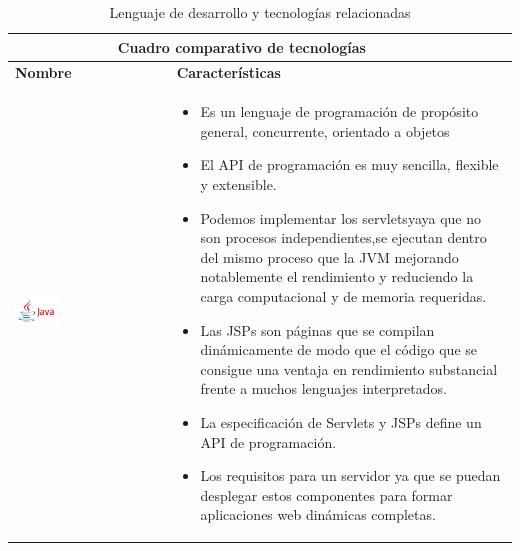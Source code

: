 \newpage
\begin{table}[b!]
	\centering
	\vspace{-30mm}
	\begin{tabular}{|p{2cm}|ll}
		\hline
		\multicolumn{2}{|c|}{{\bf Cuadro comparativo de tecnologías}} \\ 
		\hline
		\multicolumn{1}{|p{4cm}|}{{\bf Nombre}}                                       &   
		\multicolumn{1}{p{10cm}|}{{\bf Características}}\\
		\hline
		\multicolumn{1}{|p{5cm}|}{\includegraphics[width=0.3\textwidth]{images/java}} &   
		\multicolumn{2}{p{10cm}|}{\begin{itemize}
		\vspace{-25mm}
		\item Es un lenguaje de programación de propósito general, concurrente, orientado a objetos 
		\item El API de programación es muy sencilla, flexible y extensible.
		\item Podemos implementar los servletsyaya que no son procesos independientes,se ejecutan dentro del mismo proceso que la JVM mejorando notablemente el rendimiento y reduciendo la carga computacional y de memoria requeridas.
		\item Las JSPs son páginas que se compilan dinámicamente de modo que el código que se consigue una ventaja en rendimiento substancial frente a muchos lenguajes interpretados.
		\item La especificación de Servlets y JSPs define un API de programación.
		\item Los requisitos para un servidor ya que se puedan desplegar estos componentes para formar aplicaciones web dinámicas completas. \cite{40}
		\end{itemize}} \\
		\hline
	\end{tabular}
	\caption{Lenguaje de desarrollo y tecnologías relacionadas}
	\label{table: Lenguaje de desarrollo}
\end{table}

